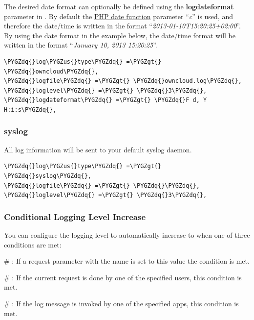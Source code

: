 \documentclass[letterpaper,10pt,english]{sphinxmanual}
\def\PYGZus{\char`\_}
\def\PYGZgt{\char`\>}
\def\PYGZdq{\char`\"}
\begin{document}
The desired date format can optionally be defined using the \textbf{logdateformat} parameter in .
By default the \href{http://www.php.net/manual/en/function.date.php}{PHP date function} parameter ``\emph{c}'' is used, and therefore the
date/time is written in the format ``\emph{2013-01-10T15:20:25+02:00}''. By using the
date format in the example below, the date/time format will be written in the format
``\emph{January 10, 2013 15:20:25}''.

\begin{Verbatim}[commandchars=\\\{\}]
\PYGZdq{}log\PYGZus{}type\PYGZdq{} =\PYGZgt{} \PYGZdq{}owncloud\PYGZdq{},
\PYGZdq{}logfile\PYGZdq{} =\PYGZgt{} \PYGZdq{}owncloud.log\PYGZdq{},
\PYGZdq{}loglevel\PYGZdq{} =\PYGZgt{} \PYGZdq{}3\PYGZdq{},
\PYGZdq{}logdateformat\PYGZdq{} =\PYGZgt{} \PYGZdq{}F d, Y H:i:s\PYGZdq{},
\end{Verbatim}


\subsubsection{syslog}
\label{configuration_server/logging_configuration:syslog}
All log information will be sent to your default syslog daemon.

\begin{Verbatim}[commandchars=\\\{\}]
\PYGZdq{}log\PYGZus{}type\PYGZdq{} =\PYGZgt{} \PYGZdq{}syslog\PYGZdq{},
\PYGZdq{}logfile\PYGZdq{} =\PYGZgt{} \PYGZdq{}\PYGZdq{},
\PYGZdq{}loglevel\PYGZdq{} =\PYGZgt{} \PYGZdq{}3\PYGZdq{},
\end{Verbatim}


\subsubsection{Conditional Logging Level Increase}
\label{configuration_server/logging_configuration:conditional-logging-level-increase}
You can configure the logging level to automatically increase to  when one of three conditions are met:

\# : If a request parameter with the name  is set to this value the condition is met.

\# : If the current request is done by one of the specified users, this condition is met.

\# : If the log message is invoked by one of the specified apps, this condition is met.
\end{document}
